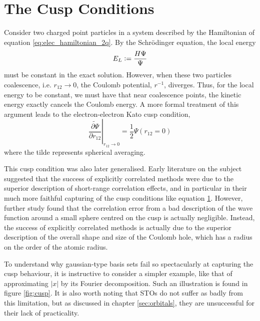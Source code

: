 \section{The Cusp Conditions}
\label{sec:cusp}

Consider two charged point particles in a system described by the Hamiltonian of equation \eqref{eq:elec_hamiltonian_2q}. By the Schr\"odinger equation, the local energy
\begin{equation}
    E_L\mathrel{\mathop:}= \frac{H\Psi}{\Psi}
\end{equation}
must be constant in the exact solution. However, when these two particles coalescence, i.e. $r_{12}\to 0$, the Coulomb potential, $r^{-1}$, diverges. Thus, for the local energy to be constant, we must have that near coalescence points, the kinetic energy exactly cancels the Coulomb energy. A more formal treatment of this argument leads to the electron-electron Kato cusp condition,\cite{katoEigenfunctionsManyparticleSystems1957a}
\begin{equation}
    \label{eq:cusp}
    \left.\widetilde{\frac{\partial \Psi}{\partial r_{12}}}\right|_{r_{12}\to 0}
    = \frac 12 \Psi(r_{12}=0)
\end{equation}
where the tilde represents spherical averaging.

This cusp condition was also later generalised.\cite{packCuspConditionsMolecular1966,kurokawaChapterTwoGeneral2016}
Early literature on the subject suggested that the success of explicitly correlated methods were due to the superior description of short-range correlation effects, and in particular in their much more faithful capturing of the cusp conditions like equation \ref{sec:cusp}.\cite{roothaanAnalytical1960,watsonApproximate1960,weissConfiguration1961,schwartzGround1962}
However, further study found that the correlation error from a bad description of the wave function around a small sphere centred on the cusp is actually negligible.\cite{coulsonElectron1961,gilbertInterpretation1963,prendergastImpact2001,klopperR122007} Instead, the success of explicitly correlated methods is actually due to the superior description of the overall shape and size of the Coulomb hole, which has a radius on the order of the atomic radius.

To understand why gaussian-type basis sets fail so spectacularly at capturing the cusp behaviour, it is instructive to consider a simpler example, like that of approximating $|x|$ by its Fourier decomposition. Such an illustration is found in figure \ref{fig:cusp}. It is also worth noting that \glspl{STO} do not suffer as badly from this limitation\cite{kongExplicitly2012}, but as discussed in chapter \ref{sec:orbitals}, they are unsuccessful for their lack of practicality.

